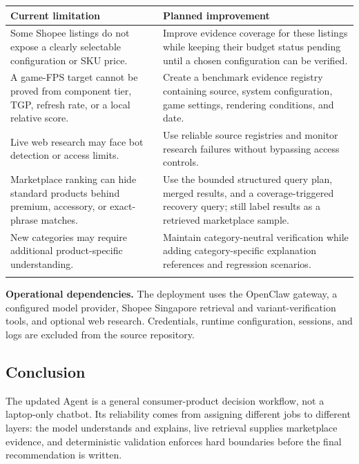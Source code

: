 \documentclass[11pt,letterpaper]{article}
\newcommand{\thead}[1]{\bfseries\centering #1\arraybackslash}
\begin{document}
\begin{tabularx}{\textwidth}{@{}p{2.67in}Y@{}}
\thead{Current limitation} & \thead{Planned improvement} \\
\toprule
Some Shopee listings do not expose a clearly selectable configuration or SKU price. & Improve evidence coverage for these listings while keeping their budget status pending until a chosen configuration can be verified. \\
A game-FPS target cannot be proved from component tier, TGP, refresh rate, or a local relative score. & Create a benchmark evidence registry containing source, system configuration, game settings, rendering conditions, and date. \\
Live web research may face bot detection or access limits. & Use reliable source registries and monitor research failures without bypassing access controls. \\
Marketplace ranking can hide standard products behind premium, accessory, or exact-phrase matches. & Use the bounded structured query plan, merged results, and a coverage-triggered recovery query; still label results as a retrieved marketplace sample. \\
New categories may require additional product-specific understanding. & Maintain category-neutral verification while adding category-specific explanation references and regression scenarios. \\
\bottomrule
\end{tabularx}

\noindent\textbf{Operational dependencies.} The deployment uses the OpenClaw gateway, a configured model provider, Shopee Singapore retrieval and variant-verification tools, and optional web research. Credentials, runtime configuration, sessions, and logs are excluded from the source repository.

\subsection{Conclusion}

The updated Agent is a general consumer-product decision workflow, not a laptop-only chatbot. Its reliability comes from assigning different jobs to different layers: the model understands and explains, live retrieval supplies marketplace evidence, and deterministic validation enforces hard boundaries before the final recommendation is written.
\end{document}
